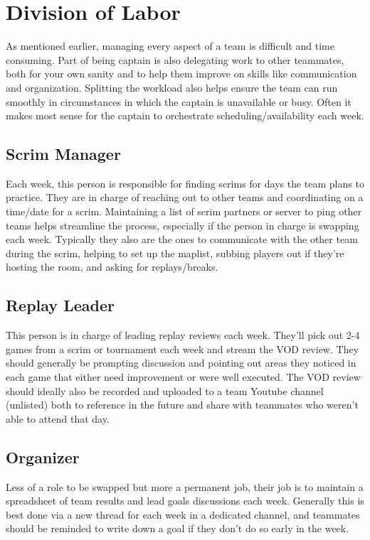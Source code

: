 \documentclass[12pt]{article}
\begin{document}
\section{Division of Labor}
As mentioned earlier, managing every aspect of a team is difficult and time consuming. Part of being captain is also delegating work to other teammates, both for your own sanity and to help them improve on skills like communication and organization. Splitting the workload also helps ensure the team can run smoothly in circumstances in which the captain is unavailable or busy. Often it makes most sense for the captain to orchestrate scheduling/availability each week.

\subsection{Scrim Manager}
Each week, this person is responsible for finding scrims for days the team plans to practice. They are in charge of reaching out to other teams and coordinating on a time/date for a scrim. Maintaining a list of scrim partners or server to ping other teams helps streamline the process, especially if the person in charge is swapping each week. Typically they also are the ones to communicate with the other team during the scrim, helping to set up the maplist, subbing players out if they're hosting the room, and asking for replays/breaks.
\subsection{Replay Leader}
This person is in charge of leading replay reviews each week. They'll pick out 2-4 games from a scrim or tournament each week and stream the VOD review. They should generally be prompting discussion and pointing out areas they noticed in each game that either need improvement or were well executed. The VOD review should ideally also be recorded and uploaded to a team Youtube channel (unlisted) both to reference in the future and share with teammates who weren't able to attend that day.
\subsection{Organizer}
Less of a role to be swapped but more a permanent job, their job is to maintain a spreadsheet of team results and lead goals discussions each week. Generally this is best done via a new thread for each week in a dedicated channel, and teammates should be reminded to write down a goal if they don't do so early in the week. 
\end{document}
